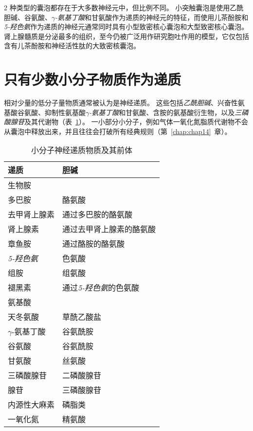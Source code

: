 2 种类型的囊泡都存在于大多数神经元中，但比例不同。
小突触囊泡是使用乙酰胆碱、谷氨酸、\textit{$\gamma$-氨基丁酸}和甘氨酸作为递质的神经元的特征，而使用儿茶酚胺和\textit{5-羟色氨}作为递质的神经元通常同时具有小型致密核心囊泡和大型致密核心囊泡。
肾上腺髓质是分泌最多的组织，至今仍被广泛用作研究胞吐作用的模型，它仅包括含有儿茶酚胺和神经活性肽的大致密核囊泡。



\section{只有少数小分子物质作为递质}

相对少量的低分子量物质通常被认为是神经递质。
这些包括\textit{乙酰胆碱}、兴奋性氨基酸谷氨酸、抑制性氨基酸\textit{$\gamma$-氨基丁酸}和甘氨酸、含胺的氨基酸衍生物，以及\textit{三磷酸腺苷}及其代谢物（表~\ref{tab:16_1}）。
一小部分小分子，例如气体一氧化氮脂质代谢物不会从囊泡中释放出来，并且往往会打破所有经典规则（第~\ref{chap:chap14}~章）。


\begin{table}[htbp]
	\caption{小分子神经递质物质及其前体} \label{tab:16_1} \centering
	\begin{tabular}{ll}
		\toprule
		递质 & 胆碱 \\
		\midrule
		生物胺 &   \\
		多巴胺 & 酪氨酸 \\
		去甲肾上腺素 & 通过多巴胺的酪氨酸 \\
		肾上腺素 & 通过去甲肾上腺素的酪氨酸 \\
		章鱼胺 & 通过酪胺的酪氨酸 \\
		\textit{5-羟色氨} & 色氨酸 \\
		组胺 & 组氨酸 \\
		褪黑素 & 通过\textit{5-羟色氨}的色氨酸 \\
		氨基酸 &  \\
		天冬氨酸 & 草酰乙酸盐 \\
		$\gamma$-氨基丁酸 & 谷氨酰胺 \\
		谷氨酸 & 谷氨酰胺 \\
		甘氨酸 & 丝氨酸 \\
		三磷酸腺苷 & 二磷酸腺苷 \\
		腺苷 & 三磷酸腺苷 \\
		内源性大麻素 & 磷脂类 \\
		一氧化氮 & 精氨酸 \\
		\bottomrule
	\end{tabular}
\end{table}


